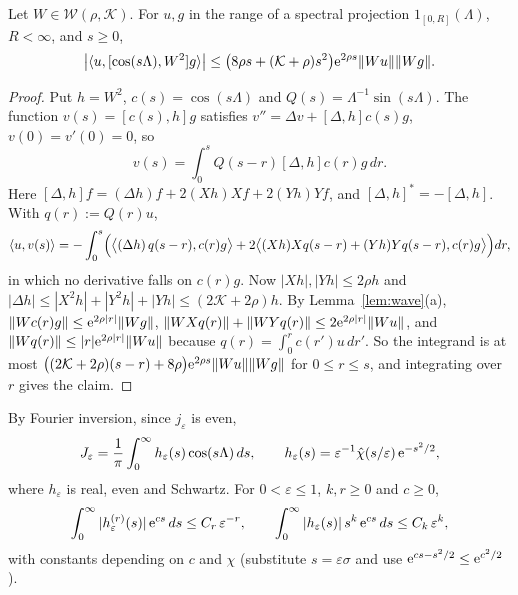 \begin{lemma}\label{lem:wcomm}
Let $W\in\mathcal W(\rho,\mathcal K)$. For $u,g$ in the range of a spectral projection $1_{[0,R]}(\Lambda)$, $R<\infty$, and $s\ge0$,
\[
\bigl|\langle u,[\cos(s\Lambda),W^2]g\rangle\bigr|\le\bigl(8\rho s+(\mathcal K+\rho)s^2\bigr)\mathrm{e}^{2\rho s}\lVert Wu\rVert\lVert Wg\rVert.
\]
\end{lemma}
\begin{proof}
Put $h=W^2$, $c(s)=\cos(s\Lambda)$ and $Q(s)=\Lambda^{-1}\sin(s\Lambda)$. The function
$v(s)=[c(s),h]g$ satisfies $v''=\Delta v+[\Delta,h]c(s)g$, $v(0)=v'(0)=0$, so
\[
v(s)=\int_0^sQ(s-r)[\Delta,h]c(r)g\,dr.
\]
Here
$[\Delta,h]f=(\Delta h)f+2(Xh)Xf+2(Yh)Yf$, and $[\Delta,h]^*=-[\Delta,h]$. With $q(r):=Q(r)u$,
\[
\langle u,v(s)\rangle=-\int_0^s\Bigl(\bigl\langle(\Delta h)\,q(s-r),c(r)g\bigr\rangle+2\bigl\langle(Xh)Xq(s-r)+(Yh)Yq(s-r),c(r)g\bigr\rangle\Bigr)dr,
\]
in which no derivative falls on $c(r)g$. Now
$|Xh|,|Yh|\le2\rho h$ and $|\Delta h|\le|X^2h|+|Y^2h|+|Yh|\le(2\mathcal K+2\rho)h$. By Lemma~\ref{lem:wave}(a),
$\lVert Wc(r)g\rVert\le\mathrm{e}^{2\rho|r|}\lVert Wg\rVert$, $\lVert WXq(r)\rVert+\lVert WYq(r)\rVert\le2\mathrm{e}^{2\rho|r|}\lVert Wu\rVert$, and
$\lVert Wq(r)\rVert\le|r|\mathrm{e}^{2\rho|r|}\lVert Wu\rVert$ because $q(r)=\int_0^rc(r')u\,dr'$. So the integrand is at most
$\bigl((2\mathcal K+2\rho)(s-r)+8\rho\bigr)\mathrm{e}^{2\rho s}\lVert Wu\rVert\lVert Wg\rVert$ for $0\le r\le s$, and integrating over $r$ gives the claim.
\end{proof}

By Fourier inversion, since $j_\varepsilon$ is even,
\[
J_\varepsilon=\frac1\pi\int_0^\infty h_\varepsilon(s)\cos(s\Lambda)\,ds,\qquad h_\varepsilon(s)=\varepsilon^{-1}\hat\chi(s/\varepsilon)\,\mathrm{e}^{-s^2/2},
\]
where $h_\varepsilon$ is real, even and Schwartz. For $0<\varepsilon\le1$, $k,r\ge0$ and $c\ge0$,
\begin{equation}\label{eq:hmom}
\int_0^\infty|h_\varepsilon^{(r)}(s)|\,\mathrm{e}^{cs}\,ds\le C_{r}\,\varepsilon^{-r},\qquad\int_0^\infty|h_\varepsilon(s)|\,s^k\,\mathrm{e}^{cs}\,ds\le C_{k}\,\varepsilon^{k},
\end{equation}
with constants depending on $c$ and $\chi$ (substitute $s=\varepsilon\sigma$ and use $\mathrm{e}^{cs-s^2/2}\le\mathrm{e}^{c^2/2}$).

